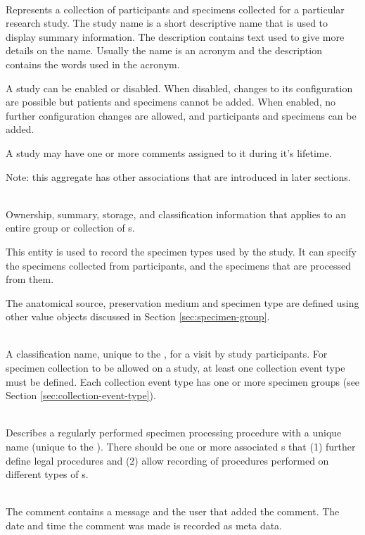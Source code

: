 \begin{description}[listparindent=\parindent]

  \item[\entitytarget{Study}] \hfill \\ Represents a collection of participants
    and specimens collected for a particular research study. The study name is
    a short descriptive name that is used to display summary information. The
    description contains text used to give more details on the name. Usually
    the name is an acronym and the description contains the words used in the
    acronym.

    A study can be enabled or disabled. When disabled, changes to its
    configuration are possible but patients and specimens cannot be added. When
    enabled, no further configuration changes are allowed, and participants and
    specimens can be added.

    A study may have one or more comments assigned to it during it's lifetime.

    Note: this aggregate has other associations that are introduced in later
    sections.

  \item[\entitytarget{SpecimenGroup}] \hfill \\ Ownership, summary, storage,
    and classification information that applies to an entire group or
    collection of s.

    This entity is used to record the specimen types used by the study. It can
    specify the specimens collected from participants, and the specimens that
    are processed from them.

    The anatomical source, preservation medium and specimen type are defined
    using other value objects discussed in Section \ref{sec:specimen-group}.

  \item[\entitytarget{CollectionEventType}] \hfill \\ A classification name,
    unique to the , for a visit by study participants. For
    specimen collection to be allowed on a study, at least one collection event
    type must be defined. Each collection event type has one or more specimen
    groups (see Section \ref{sec:collection-event-type}).

  \item[\entitytarget{ProcessingType}] \hfill \\ Describes a regularly
    performed specimen processing procedure with a unique name (unique to the
    ). There should be one or more associated
    s that (1) further define legal procedures and
    (2) allow recording of procedures performed on different types of
    s.

  \item[\valobjtarget{StudyComment}] \hfill \\ The comment contains a message
    and the user that added the comment. The date and time the comment was made
    is recorded as meta data.

\end{description}

